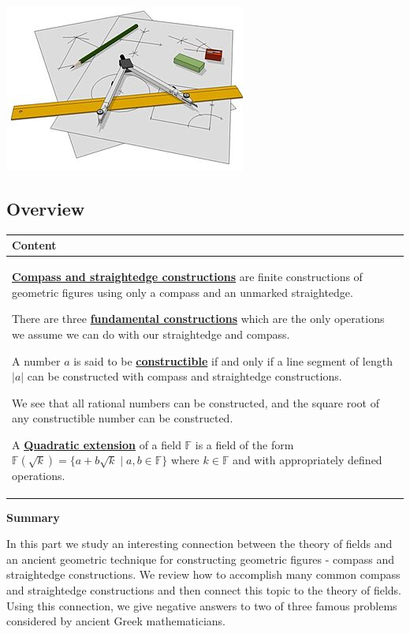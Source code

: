 \documentclass[11pt]{article}
\newcommand\header[1]{\vspace*{4pt}\par {\large {\bf #1}}\par}
\renewcommand\emph[1]{\underline{\bf{#1}}} %
\theoremstyle{definition}
\begin{document}
\begin{center}
\includegraphics{Images/straight_edge_compass_wikipedia.jpg}
\end{center}

\subsection{Overview}
 
 \vspace*{-16pt}
\begin{tabular}{L{6.5in}} 
{\bf Content} \\ \hline \parskip4pt

\emph{Compass and straightedge constructions} are finite constructions of geometric figures
using only a compass and an unmarked straightedge.

There are three \emph{fundamental constructions} which are the only operations we
assume we can do with our straightedge and compass.

A number $a$ is said to be \emph{constructible} if and only if a line segment of
length $|a|$ can be constructed with compass and straightedge constructions.

We see that all rational numbers can be constructed, and the square root of
any constructible number can be constructed.

A \emph{Quadratic extension} of a field $\mathbb{F}$ is a field of the form
$\mathbb{F}(\sqrt{k}) = \{ a + b\sqrt{k} \mid a,b\in\mathbb{F}\}$ where $k\in\mathbb{F}$
and with appropriately defined operations.


\end{tabular}

\header{Summary}

In this part we study an interesting connection between the theory of fields and
an ancient geometric technique for constructing geometric figures - compass and
straightedge constructions. We review how to accomplish many common compass and
straightedge constructions and then connect this topic to the theory of fields.
Using this connection, we give negative answers to two of three famous problems
considered by ancient Greek mathematicians.
\end{document}
